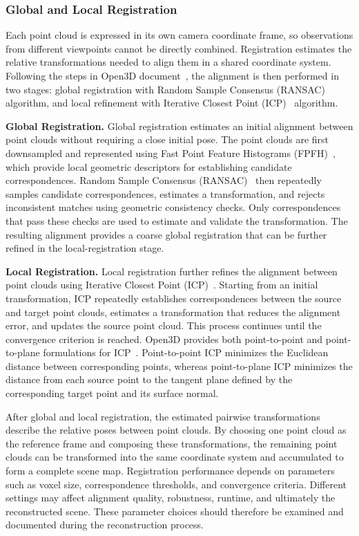 \documentclass[11pt]{article}
\begin{document}
\subsubsection{Global and Local Registration}

Each point cloud is expressed in its own camera coordinate frame, so observations from different viewpoints cannot be directly combined. Registration estimates the relative transformations needed to align them in a shared coordinate system. Following the steps in Open3D document~\cite{open3dglobal}, the alignment is then performed in two stages: global registration with Random Sample Consensus (RANSAC)~\cite{fischler1981ransac} algorithm, and local refinement with Iterative Closest Point (ICP)~\cite{chen1992object} algorithm.

\vspace{0.5em}
\noindent\textbf{Global Registration.}
Global registration estimates an initial alignment between point clouds without requiring a close initial pose. The point clouds are first downsampled and represented using Fast Point Feature Histograms (FPFH)~\cite{rusu2009fast}, which provide local geometric descriptors for establishing candidate correspondences. Random Sample Consensus (RANSAC)~\cite{fischler1981ransac} then repeatedly samples candidate correspondences, estimates a transformation, and rejects inconsistent matches using geometric consistency checks. Only correspondences that pass these checks are used to estimate and validate the transformation. The resulting alignment provides a coarse global registration that can be further refined in the local-registration stage.

\vspace{0.5em}
\noindent\textbf{Local Registration.}
Local registration further refines the alignment between point clouds using Iterative Closest Point (ICP)~\cite{chen1992object}. Starting from an initial transformation, ICP repeatedly establishes correspondences between the source and target point clouds, estimates a transformation that reduces the alignment error, and updates the source point cloud. This process continues until the convergence criterion is reached. Open3D provides both point-to-point and point-to-plane formulations for ICP~\cite{open3dglobal}. Point-to-point ICP minimizes the Euclidean distance between corresponding points, whereas point-to-plane ICP minimizes the distance from each source point to the tangent plane defined by the corresponding target point and its surface normal. 

\vspace{0.5em}
After global and local registration, the estimated pairwise transformations describe the relative poses between point clouds. By choosing one point cloud as the reference frame and composing these transformations, the remaining point clouds can be transformed into the same coordinate system and accumulated to form a complete scene map. Registration performance depends on parameters such as voxel size, correspondence thresholds, and convergence criteria. Different settings may affect alignment quality, robustness, runtime, and ultimately the reconstructed scene. These parameter choices should therefore be examined and documented during the reconstruction process.
\end{document}
